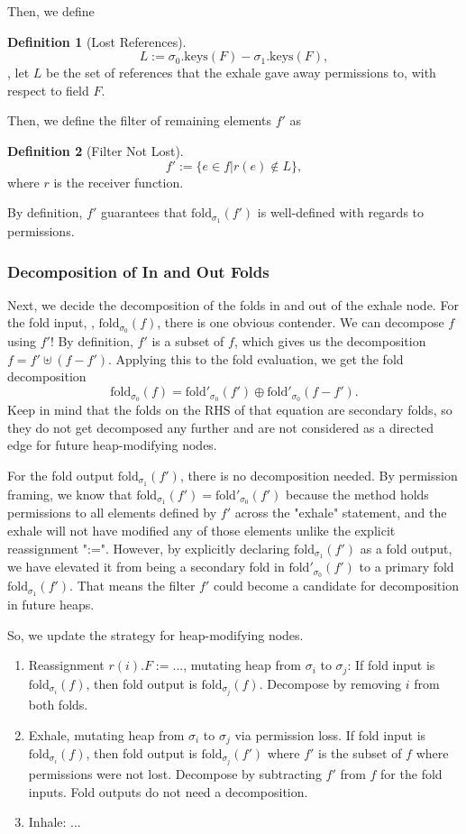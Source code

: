 \documentclass[msc,oneside]{ubcthesis}
\theoremstyle{definition}
\newtheorem{definition}{Definition}
\begin{document}
Then, we define 
\begin{definition}[Lost References]\label{def:Lost}
$$L := \sigma_0.\textrm{keys}(F) - \sigma_1.\textrm{keys}(F),$$
\ie, let $L$ be the set of references that the exhale gave away permissions to, with respect to field $F$.
\end{definition}

Then, we define the filter of remaining elements $f'$ as
\begin{definition}[Filter Not Lost]\label{def:notLost}
$$f' := \{e \in f | r(e) \not\in L \},$$ where $r$ is the receiver function. 
\end{definition}
By definition, $f'$ guarantees that $\textrm{fold}_{\sigma_1}(f')$ is well-defined with regards to permissions. 

\subsubsection{Decomposition of In and Out Folds}
Next, we decide the decomposition of the folds in and out of the exhale node. For the fold input, \ie, $\textrm{fold}_{\sigma_0}(f)$,  there is one obvious contender. We can decompose $f$ using $f'$! By definition,  $f'$ is a subset of $f$, which gives us the decomposition $f = f' \uplus (f-f')$. Applying this to the fold evaluation, we get the fold decomposition
$$\textrm{fold}_{\sigma_0}(f) = \textrm{fold}'_{\sigma_0}(f') \oplus \textrm{fold}'_{\sigma_0}(f - f').$$ Keep in mind that the folds on the RHS of that equation are secondary folds, so they do not get decomposed any further and are not considered as a directed edge for future heap-modifying nodes.

For the fold output $\textrm{fold}_{\sigma_1}(f')$, there is no decomposition needed. By permission framing, we know that $\textrm{fold}_{\sigma_1}(f') = \textrm{fold}'_{\sigma_0}(f')$ because the method holds permissions to all elements defined by $f'$ across the "exhale" statement, and the exhale will not have modified any of those elements unlike the explicit reassignment ":=". However, by explicitly declaring $\textrm{fold}_{\sigma_1}(f')$ as a fold output, we have elevated it from being a secondary fold in $\textrm{fold}'_{\sigma_0}(f')$ to a primary fold $\textrm{fold}_{\sigma_1}(f')$. That means the filter $f'$ could become a candidate for decomposition in future heaps.

So, we update the strategy for heap-modifying nodes.
\begin{enumerate}
    \item Reassignment $r(i).F := ...$, mutating heap from $\sigma_i$ to $\sigma_j$: 
    If fold input is $\textrm{fold}_{\sigma_i}(f)$, then fold output is $\textrm{fold}_{\sigma_j}(f)$. 
    Decompose by removing $i$ from both folds.
    \item Exhale, mutating heap from $\sigma_i$ to $\sigma_j$ via permission loss. If fold input is $\textrm{fold}_{\sigma_i}(f)$, then fold output is $\textrm{fold}_{\sigma_j}(f')$ where $f'$ is the subset of $f$ where permissions were not lost. Decompose by subtracting $f'$ from $f$ for the fold inputs. Fold outputs do not need a decomposition.
    \item Inhale: ...
\end{enumerate}
\end{document}
